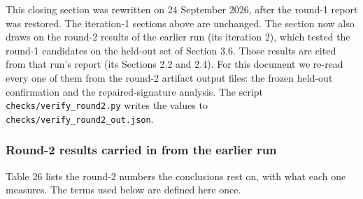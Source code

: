 \documentclass[11pt,letterpaper]{article}
\begin{document}
This closing section was rewritten on 24 September 2026, after the round-1 report was restored. The iteration-1 sections above are unchanged. The section now also draws on the round-2 results of the earlier run (its iteration 2), which tested the round-1 candidates on the held-out set of Section 3.6. Those results are cited from that run's report (its Sections 2.2 and 2.4). For this document we re-read every one of them from the round-2 artifact output files: the frozen held-out confirmation and the repaired-signature analysis. The script \texttt{checks/\allowbreak{}verify\_\allowbreak{}\allowbreak{}round2.py} writes the values to \texttt{checks/\allowbreak{}verify\_\allowbreak{}\allowbreak{}round2\_\allowbreak{}\allowbreak{}out.json}.

\subsubsection{Round-2 results carried in from the earlier run}

Table 26 lists the round-2 numbers the conclusions rest on, with what each one measures. The terms used below are defined here once.
\end{document}
